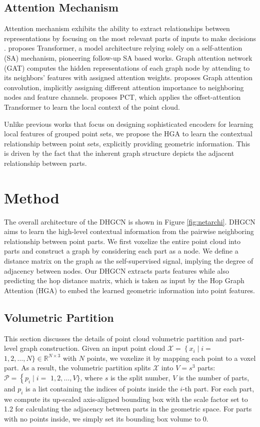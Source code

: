 \documentclass[letterpaper]{article} %
\begin{document}
\subsection{Attention Mechanism}
Attention mechanism exhibits the ability to extract relationships between representations by focusing on the most relevant parts of inputs to make decisions \cite{pointmlp}.
\citet{vaswani2017attention} proposes Transformer, a model architecture relying solely on a self-attention (SA) mechanism, pioneering follow-up SA based works.
Graph attention network (GAT) \cite{gat} computes the hidden representations of each graph node by attending to its neighbors' features with assigned attention weights. \citet{wang2019graphattenconv} proposes Graph attention convolution, implicitly assigning different attention importance to neighboring nodes and feature channels.
\citet{guo2021pct} proposes PCT, which applies the offset-attention Transformer to learn the local context of the point cloud.

Unlike previous works that focus on designing sophisticated encoders for learning local features of grouped point sets, we propose the HGA to learn the contextual relationship between point sets, explicitly providing geometric information. This is driven by the fact that the inherent graph structure depicts the adjacent relationship between parts.


\section{Method}
\label{sec:method}
The overall architecture of the DHGCN is shown in Figure \ref{fig:netarchi}.
DHGCN aims to learn the high-level contextual information from the pairwise neighboring relationship between point parts.
We first voxelize the entire point cloud into parts and construct a graph by considering each part as a node. We define a distance matrix on the graph as the self-supervised signal, implying the degree of adjacency between nodes.
Our DHGCN extracts parts features while also predicting the hop distance matrix, which is taken as input by the Hop Graph Attention (HGA) to embed the learned geometric information into point features.


\subsection{Volumetric Partition}
\label{sec:volumetricpartition}
This section discusses the details of point cloud volumetric partition and part-level graph construction.
Given an input point cloud \(\mathcal{X}=\left\{x_{i} \mid i=\right.\) \(1,2, \ldots, N\} \in \mathbb{R}^{N \times 3}\) with \(N\) points, we voxelize it by mapping each point to a voxel part.
As a result, the volumetric partition splits \(\mathcal{X}\) into \(V={s}^3\) parts: \(\mathcal{P}=\left\{p_{i} \mid i=\right.\) \(1,2, \ldots, V\}\), where \(s\) is the split number, \(V\) is the number of parts, and \(p_i\) is a list containing the indices of points inside the \(i\)-th part.
For each part, we compute its up-scaled axis-aligned bounding box with the scale factor set to 1.2 for calculating the adjacency between parts in the geometric space. For parts with no points inside, we simply set its bounding box volume to 0.
\end{document}
